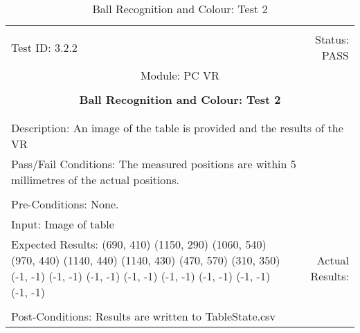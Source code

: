 \documentclass[titlepage]{article}
\begin{document}
\begin{center}
\begin{table}[h!]
\begin{tabular}{|l r|}\hline&\\[-2mm]
	Test ID: 3.2.2	&Status: PASS\\[-3mm]
	\multicolumn{2}{|c|}{Module: PC VR}\\&\\
	\multicolumn{2}{|c|}{\textbf{\large{Ball Recognition and Colour: Test 2}}}\\&\\\hline&\\[-3mm]
	\multicolumn{2}{|p{\textwidth}|}{Description: An image of the table is provided and the results of the VR }\\\hline
	\multicolumn{2}{|p{\textwidth}|}{Pass/Fail Conditions: The measured positions are within 5 millimetres of the actual positions.}\\[1mm]\hline&\\[-3mm]
	\multicolumn{2}{|p{\textwidth}|}{Pre-Conditions: None.}\\[4mm]
	\multicolumn{2}{|p{\textwidth}|}{Input: Image of table}\\[2mm]\hline
	\multicolumn{1}{|p{0.49\textwidth}}{Expected Results:\newline
(690, 410)\newline
(1150, 290)\newline
(1060, 540)\newline
(970, 440)\newline
(1140, 440)\newline
(1140, 430)\newline
(470, 570)\newline
(310, 350)\newline
(-1, -1)\newline
(-1, -1)\newline
(-1, -1)\newline
(-1, -1)\newline
(-1, -1)\newline
(-1, -1)\newline
(-1, -1)\newline
(-1, -1)\newline}	&\multicolumn{1}{|p{0.45\textwidth}|}{Actual Results:}\\\hline&\\[-3mm]
	\multicolumn{2}{|p{\textwidth}|}{Post-Conditions: Results are written to TableState.csv}\\\hline
\end{tabular}
\caption{Ball Recognition and Colour: Test 2}
\end{table}
\end{center}
\newpage
\end{document}
